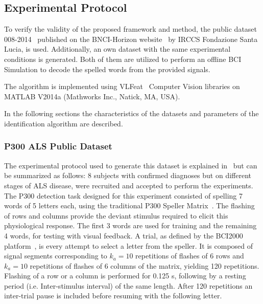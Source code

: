 \documentclass[entropy,article,submit,moreauthors,pdftex,10pt,a4paper]{mdpi}
\begin{document}



\subsection{Experimental Protocol} \label{Protocol}

To verify the validity of the proposed framework and method, the public dataset 008-2014~\citep{Riccio2013} published on the BNCI-Horizon website~\citep{Brunner2014} by  IRCCS Fondazione Santa Lucia, is used. Additionally, an own dataset with  the same experimental conditions is generated. Both of them are utilized to perform an offline BCI Simulation to decode the spelled words from the provided signals. 

The algorithm is implemented using  VLFeat~\citep{Vedaldi2010} Computer Vision libraries on MATLAB V2014a (Mathworks Inc., Natick, MA, USA). 

In the following sections the characteristics of the datasets and parameters of the identification algorithm are described. 

\subsubsection{P300 ALS Public Dataset} \label{ALSDataset}

The experimental protocol used to generate this dataset is explained in~\citep{Riccio2013} but can be summarized as follows:  8 subjects with confirmed diagnoses but on different stages of ALS disease, were recruited and accepted to perform the experiments. The P300 detection task designed for this experiment consisted of spelling 7 words of 5 letters each, using the traditional P300 Speller Matrix~\citep{Farwell1988}. The flashing of rows and columns provide the deviant stimulus required to elicit this physiological response.  The first 3 words are used for training and the remaining 4 words, for testing with visual feedback.  A trial, as defined by the BCI2000 platform~\citep{Schalk2004}, is every attempt to select a letter from the speller. It is composed of signal segments corresponding to $k_a =10$ repetitions of flashes of 6 rows and $k_a =10$ repetitions of flashes of 6 columns of the matrix, yielding 120 repetitions.  Flashing of a row or a column is performed for 0.125 s, following by a resting period (i.e. Inter-stimulus interval) of the same length.  After 120 repetitions an inter-trial pause is included before resuming with the following letter.
\end{document}
